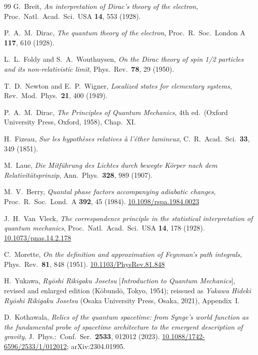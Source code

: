 \documentclass[%
 reprint, amsmath,amssymb, aps, prb, ]{revtex4-2}
\numberwithin{equation}{section}
\begin{document}
\begin{thebibliography}{99}
G.~Breit, \textit{An interpretation of Dirac's theory of the electron}, Proc.\ Natl.\ Acad.\ Sci.\ USA \textbf{14}, 553 (1928).

P.~A.~M.~Dirac, \textit{The quantum theory of the electron}, Proc.\ R.\ Soc.\ London A \textbf{117}, 610 (1928).

L.~L.~Foldy and S.~A.~Wouthuysen, \textit{On the Dirac theory of spin 1/2 particles and its non-relativistic limit}, Phys.\ Rev.\ \textbf{78}, 29 (1950).

T.~D.~Newton and E.~P.~Wigner, \textit{Localized states for elementary systems}, Rev.\ Mod.\ Phys.\ \textbf{21}, 400 (1949).

P.~A.~M.~Dirac, \textit{The Principles of Quantum Mechanics}, 4th ed.\ (Oxford University Press, Oxford, 1958), Chap.~XI.

H.~Fizeau, \textit{Sur les hypoth\`eses relatives \`a l'\'ether lumineux}, C.\ R.\ Acad.\ Sci.\ \textbf{33}, 349 (1851).

M.~Laue, \textit{Die Mitf\"uhrung des Lichtes durch bewegte K\"orper nach dem Relativit\"atsprinzip}, Ann.\ Phys.\ \textbf{328}, 989 (1907).

M.~V.~Berry, \textit{Quantal phase factors accompanying adiabatic changes}, Proc.\ R.\ Soc.\ Lond.\ A \textbf{392}, 45 (1984). \href{https://doi.org/10.1098/rspa.1984.0023}{10.1098/rspa.1984.0023}

J.~H.~Van~Vleck, \textit{The correspondence principle in the statistical interpretation of quantum mechanics}, Proc.\ Natl.\ Acad.\ Sci.\ USA \textbf{14}, 178 (1928). \href{https://doi.org/10.1073/pnas.14.2.178}{10.1073/pnas.14.2.178}

C.~Morette, \textit{On the definition and approximation of Feynman's path integrals}, Phys.\ Rev.\ \textbf{81}, 848 (1951). \href{https://doi.org/10.1103/PhysRev.81.848}{10.1103/PhysRev.81.848}

H.~Yukawa, \textit{Ry\=oshi Rikigaku Josetsu} [\textit{Introduction to Quantum Mechanics}], revised and enlarged edition (K\=obund\=o, Tokyo, 1954); reissued as \textit{Yukawa Hideki Ry\=oshi Rikigaku Josetsu} (Osaka University Press, Osaka, 2021), Appendix~I.

D.~Kothawala, \textit{Relics of the quantum spacetime: from Synge's world function as the fundamental probe of spacetime architecture to the emergent description of gravity}, J.\ Phys.:\ Conf.\ Ser.\ \textbf{2533}, 012012 (2023). \href{https://doi.org/10.1088/1742-6596/2533/1/012012}{10.1088/1742-6596/2533/1/012012}; arXiv:2304.01995.


\end{thebibliography}
\end{document}
